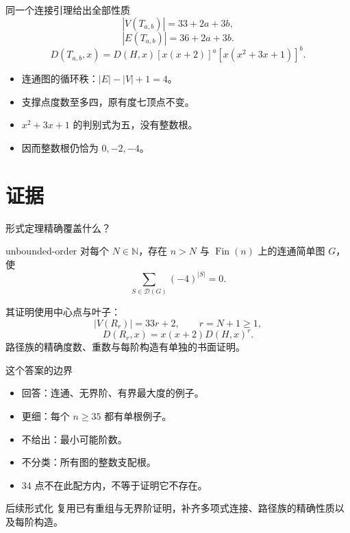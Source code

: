 \documentclass{beamer}
\begin{document}
\begin{frame}{同一个连接引理给出全部性质}
\[|V(T_{a,b})|=33+2a+3b,\]
\[|E(T_{a,b})|=36+2a+3b.\]
\[D(T_{a,b},x)=D(H,x)[x(x+2)]^a[x(x^2+3x+1)]^b.\]
\begin{itemize}
\item 连通图的循环秩：$|E|-|V|+1=4$。
\item 支撑点度数至多四，原有度七顶点不变。
\item $x^2+3x+1$ 的判别式为五，没有整数根。
\item 因而整数根仍恰为 $0,-2,-4$。
\end{itemize}
\end{frame}
\section{证据}
\begin{frame}{形式定理精确覆盖什么？}
\begin{bookresult}{unbounded-order}
对每个 $N\in\mathbb N$，存在 $n>N$ 与 $\operatorname{Fin}(n)$ 上的连通简单图 $G$，使
\[\sum_{S\in\mathcal D(G)}(-4)^{|S|}=0.\]
\end{bookresult}
其证明使用中心点与叶子：
\[|V(R_r)|=33r+2,\qquad r=N+1\geq1,\]
\[D(R_r,x)=x(x+2)D(H,x)^r.\]
路径族的精确度数、重数与每阶构造有单独的书面证明。
\end{frame}
\begin{frame}{这个答案的边界}
\begin{itemize}
\item 回答：连通、无界阶、有界最大度的例子。
\item 更细：每个 $n\geq35$ 都有单根例子。
\item 不给出：最小可能阶数。
\item 不分类：所有图的整数支配根。
\item 34 点不在此配方内，不等于证明它不存在。
\end{itemize}
\begin{block}{后续形式化}
复用已有重组与无界阶证明，补齐多项式连接、路径族的精确性质以及每阶构造。
\end{block}
\end{frame}
\end{document}

